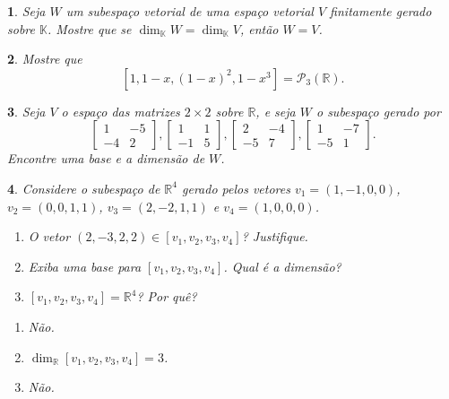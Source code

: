 \documentclass[12pt]{exam}
\newtheorem{exercicio}{}
\newcommand{\real}{\mathbb{R}}
\newcommand{\cp}[1]{\mathbb{#1}}
\begin{document}
\begin{exercicio}
  Seja $W$ um subespa\c{c}o vetorial de uma espa\c{c}o vetorial $V$ finitamente gerado sobre $\cp{K}$. Mostre que se $\dim_\cp{K}W = \dim_\cp{K}V$, ent\~ao $W = V$.
\end{exercicio}

\begin{exercicio}
  Mostre que 
    \[
      [1, 1 - x, (1 - x)^2, 1 - x^3] = \mathcal{P}_3(\real).
    \]
\end{exercicio}

\begin{exercicio}
  Seja $V$ o espa\c{c}o das matrizes $2 \times 2$ sobre $\real$, e seja $W$ o subespa\c{c}o gerado por
  \[
    \begin{bmatrix}
      1 & -5\\
      -4 & 2
    \end{bmatrix},
    \begin{bmatrix}
      1 & 1\\
      -1 & 5
    \end{bmatrix},
    \begin{bmatrix}
      2 & -4\\
      -5 & 7
    \end{bmatrix},
    \begin{bmatrix}
      1 & -7\\
      -5 & 1
    \end{bmatrix}.
  \]
Encontre uma base e a dimens\~ao de $W$.
\end{exercicio}

\begin{exercicio}
  Considere o subespa\c{c}o de $\real^4$ gerado pelos vetores $v_1 = (1, -1, 0, 0)$, $v_2 = (0, 0, 1, 1)$, $v_3 = (2, -2, 1, 1)$ e $v_4 = (1, 0, 0, 0)$.
  \begin{enumerate}[label={\alph*})]
    \item O vetor $(2, -3, 2, 2) \in [v_1, v_2, v_3, v_4]$? Justifique.
    \item Exiba uma base para $[v_1, v_2, v_3, v_4]$. Qual \'e a dimens\~ao?
    \item $[v_1, v_2, v_3, v_4] = \real^4$? Por qu\^e?
  \end{enumerate}
  \begin{solucao}
    \begin{enumerate}[label={\alph*})]
      \item N\~ao.
      \item $\dim_\real [v_1, v_2, v_3, v_4] = 3$.
      \item N\~ao.
    \end{enumerate}
  \end{solucao}
\end{exercicio}
\end{document}
